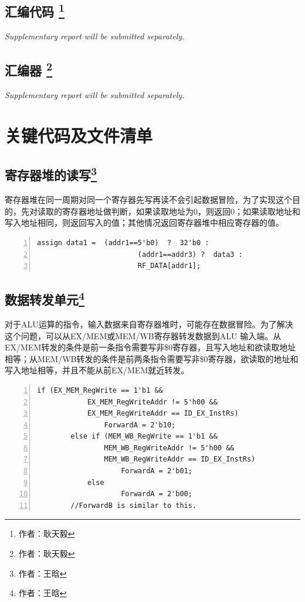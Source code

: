 \documentclass{article}
\begin{document}
        \subsection{汇编代码 \protect\footnote{作者：耿天毅}}
            \emph{Supplementary report will be submitted separately.}
            
        \subsection{汇编器 \protect\footnote{作者：耿天毅}}
            \emph{Supplementary report will be submitted separately.}
            
    \section{关键代码及文件清单}
        \subsection{寄存器堆的读写\protect\footnote{作者：王晗}}
            寄存器堆在同一周期对同一个寄存器先写再读不会引起数据冒险，为了实现这个目的，先对读取的寄存器地址做判断，如果读取地址为0，则返回0；如果读取地址和写入地址相同，则返回写入的值；其他情况返回寄存器堆中相应寄存器的值。
            \begin{Verbatim}[frame=lines,numbers=left,stepnumber=5,label={regfile.v}]
        assign data1 =  (addr1==5'b0)  ?  32'b0 :
                        (addr1==addr3) ?  data3 :
                        RF_DATA[addr1];
            \end{Verbatim}

        \subsection{数据转发单元\protect\footnote{作者：王晗}}
            对于ALU运算的指令，输入数据来自寄存器堆时，可能存在数据冒险。为了解决这个问题，可以从EX/MEM或MEM/WB寄存器转发数据到ALU 输入端。从EX/MEM转发的条件是前一条指令需要写非\$0寄存器，且写入地址和欲读取地址相等；从MEM/WB转发的条件是前两条指令需要写非\$0寄存器，欲读取的地址和写入地址相等，并且不能从前EX/MEM就近转发。
            \begin{Verbatim}[frame=lines,numbers=left,stepnumber=5,label={ForwardUnit.v}]
        if (EX_MEM_RegWrite == 1'b1 &&
        	EX_MEM_RegWriteAddr != 5'h00 &&
        	EX_MEM_RegWriteAddr == ID_EX_InstRs)
        		ForwardA = 2'b10;
        else if (MEM_WB_RegWrite == 1'b1 &&
        		MEM_WB_RegWriteAddr != 5'h00 &&
        		MEM_WB_RegWriteAddr == ID_EX_InstRs)
        			ForwardA = 2'b01;
        	else
        			ForwardA = 2'b00;
        //ForwardB is similar to this.
            \end{Verbatim}
\end{document}
